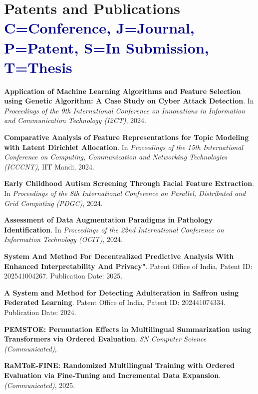 \documentclass[a4paper,11pt]{article}
\begin{document}
\section{\textbf{Patents and Publications} \hfill \textcolor{darkblue}{\scriptsize C=Conference, J=Journal, P=Patent, S=In Submission, T=Thesis}}
\vspace{0.2mm}
\small{
\begin{enumerate}[leftmargin=*, labelsep=0.5em, align=left, widest={[\textbf{S.1}]}, itemindent=0em, label={\textbf{[\arabic*]}}]

\item[\textbf{[C.1]}] \textbf{Application of Machine Learning Algorithms and Feature Selection using Genetic Algorithm: A Case Study on Cyber Attack Detection}. In \textit{Proceedings of the 9th International Conference on Innovations in Information and Communication Technology (I2CT)}, 2024.

\item[\textbf{[C.2]}] \textbf{Comparative Analysis of Feature Representations for Topic Modeling with Latent Dirichlet Allocation}. In \textit{Proceedings of the 15th International Conference on Computing, Communication and Networking Technologies (ICCCNT)}, IIT Mandi, 2024.

\item[\textbf{[C.3]}] \textbf{Early Childhood Autism Screening Through Facial Feature Extraction}. In \textit{Proceedings of the 8th International Conference on Parallel, Distributed and Grid Computing (PDGC)}, 2024.

\item[\textbf{[C.4]}] \textbf{Assessment of Data Augmentation Paradigms in Pathology Identification}. In \textit{Proceedings of the 22nd International Conference on Information Technology (OCIT)}, 2024.

\item[\textbf{[P.1]}] \textbf{System And Method For Decentralized Predictive Analysis With Enhanced Interpretability And Privacy"}. Patent Office of India, Patent ID: 202541004267. Publication Date: 2025.

\item[\textbf{[P.2]}] \textbf{A System and Method for Detecting Adulteration in Saffron using Federated Learning}. Patent Office of India, Patent ID: 202441074334. Publication Date: 2024.

\item[\textbf{[S.1]}] \textbf{PEMSTOE: Permutation Effects in Multilingual Summarization using Transformers via Ordered Evaluation}. 
\textit{SN Computer Science (Communicated)}, 

\item[\textbf{[S.2]}] \textbf{RaMToE-FINE: Randomized Multilingual Training with Ordered Evaluation via Fine-Tuning and Incremental Data Expansion}.  
\textit{(Communicated)}, 2025.

\end{enumerate}
}
\end{document}
